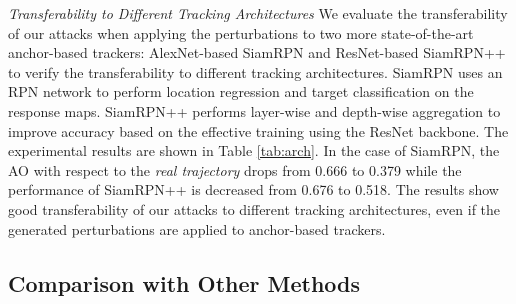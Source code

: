 \documentclass[journal]{IEEEtran}
\begin{document}
\textit{Transferability to Different Tracking Architectures} We evaluate the transferability of our attacks when applying the perturbations to two more state-of-the-art anchor-based trackers: AlexNet-based SiamRPN \cite{SiamRPN} and ResNet-based SiamRPN++ \cite{SiamRPN++} to verify the transferability to different tracking architectures.
SiamRPN uses an RPN network to perform location regression and target classification on the response maps. SiamRPN++ performs layer-wise and depth-wise aggregation to improve accuracy based on the effective training using the ResNet backbone. The experimental results are shown in Table \ref{tab:arch}. In the case of SiamRPN, the AO with respect to the \textit{real trajectory} drops from 0.666 to 0.379 while the performance of SiamRPN++ is decreased from 0.676 to 0.518. The results show good transferability of our attacks to different tracking architectures, even if the generated perturbations are applied to anchor-based trackers.

\subsection{Comparison with Other Methods}
\end{document}
